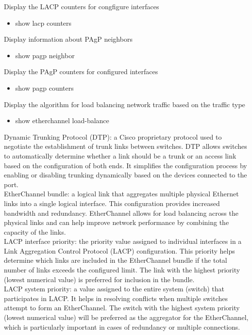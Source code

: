 \documentclass{article}
\begin{document}
Display the LACP counters for congfigure interfaces
\begin{itemize}
\item show lacp counters
\end{itemize}

Display information about PAgP neighbors
\begin{itemize}
\item show pagp neighbor
\end{itemize}

Display the PAgP counters for configured interfaces
\begin{itemize}
\item show pagp counters
\end{itemize}

Display the algorithm for load balancing network traffic based on the traffic type
\begin{itemize}
\item show etherchannel load-balance
\end{itemize}

Dynamic Trunking Protocol (DTP): a Cisco proprietary protocol used to negotiate the establishment of trunk links between switches. DTP allows switches to automatically determine whether a link should be a trunk or an access link based on the configuration of both ends. It simplifies the configuration process by enabling or disabling trunking dynamically based on the devices connected to the port.\\

EtherChannel bundle: a logical link that aggregates multiple physical Ethernet links into a single logical interface. This configuration provides increased bandwidth and redundancy. EtherChannel allows for load balancing across the physical links and can help improve network performance by combining the capacity of the links.\\

LACP interface priority: the priority value assigned to individual interfaces in a Link Aggregation Control Protocol (LACP) configuration. This priority helps determine which links are included in the EtherChannel bundle if the total number of links exceeds the configured limit. The link with the highest priority (lowest numerical value) is preferred for inclusion in the bundle.\\

LACP system priority: a value assigned to the entire system (switch) that participates in LACP. It helps in resolving conflicts when multiple switches attempt to form an EtherChannel. The switch with the highest system priority (lowest numerical value) will be preferred as the aggregator for the EtherChannel, which is particularly important in cases of redundancy or multiple connections.\\
\end{document}
